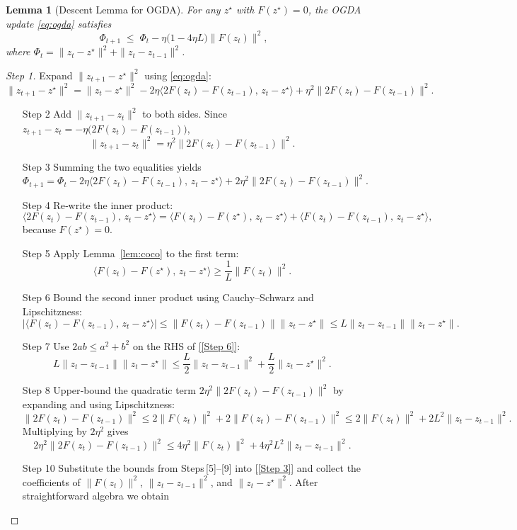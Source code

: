 \documentclass[11pt]{article}
\newtheorem{lemma}{Lemma}[section]
\begin{document}
\begin{lemma}[Descent Lemma for OGDA]\label{lem:descent}
For any $z^{\star}$ with $F(z^{\star})=0$, the OGDA update \eqref{eq:ogda} satisfies
\[
\Phi_{t+1}\;\le\;\Phi_t-\eta\bigl(1-4\eta L\bigr)\|F(z_t)\|^2,
\tag{L.2}
\]
where $\Phi_t=\|z_t-z^{\star}\|^2+\|z_t-z_{t-1}\|^2$.
\end{lemma}
\begin{proof}[Step 1] Expand $\|z_{t+1}-z^{\star}\|^2$ using \eqref{eq:ogda}:
\[
\|z_{t+1}-z^{\star}\|^2
= \|z_t-z^{\star}\|^2-2\eta\langle 2F(z_t)-F(z_{t-1}),\,z_t-z^{\star}\rangle
+\eta^2\|2F(z_t)-F(z_{t-1})\|^2.
\tag{[Step 1]}
\]
\begin{itemize}
\item[Step 2] Add $\|z_{t+1}-z_t\|^2$ to both sides. Since $z_{t+1}-z_t=-\eta\bigl(2F(z_t)-F(z_{t-1})\bigr)$,
\[
\|z_{t+1}-z_t\|^2=\eta^2\|2F(z_t)-F(z_{t-1})\|^2.
\tag{[Step 2]}
\]
\item[Step 3] Summing the two equalities yields
\[
\Phi_{t+1}= \Phi_t-2\eta\langle 2F(z_t)-F(z_{t-1}),\,z_t-z^{\star}\rangle
+2\eta^2\|2F(z_t)-F(z_{t-1})\|^2.
\tag{[Step 3]}
\]
\item[Step 4] Re‑write the inner product:
\[
\langle 2F(z_t)-F(z_{t-1}),\,z_t-z^{\star}\rangle
= \langle F(z_t)-F(z^{\star}),\,z_t-z^{\star}\rangle
+ \langle F(z_t)-F(z_{t-1}),\,z_t-z^{\star}\rangle,
\tag{[Step 4]}
\]
because $F(z^{\star})=0$.
\item[Step 5] Apply Lemma~\ref{lem:coco} to the first term:
\[
\langle F(z_t)-F(z^{\star}),\,z_t-z^{\star}\rangle\ge\frac{1}{L}\|F(z_t)\|^2.
\tag{[Step 5]}
\]
\item[Step 6] Bound the second inner product using Cauchy–Schwarz and Lipschitzness:
\[
|\langle F(z_t)-F(z_{t-1}),\,z_t-z^{\star}\rangle|
\le\|F(z_t)-F(z_{t-1})\|\|z_t-z^{\star}\|
\le L\|z_t-z_{t-1}\|\|z_t-z^{\star}\|.
\tag{[Step 6]}
\]
\item[Step 7] Use $2ab\le a^2+b^2$ on the RHS of \eqref{[Step 6]}:
\[
L\|z_t-z_{t-1}\|\|z_t-z^{\star}\|
\le\frac{L}{2}\|z_t-z_{t-1}\|^2+\frac{L}{2}\|z_t-z^{\star}\|^2.
\tag{[Step 7]}
\]
\item[Step 8] Upper‑bound the quadratic term $2\eta^2\|2F(z_t)-F(z_{t-1})\|^2$ by expanding and using Lipschitzness:
\[
\|2F(z_t)-F(z_{t-1})\|^2
\le 2\|F(z_t)\|^2+2\|F(z_t)-F(z_{t-1})\|^2
\le 2\|F(z_t)\|^2+2L^2\|z_t-z_{t-1}\|^2.
\tag{[Step 8]}
\]
Multiplying by $2\eta^2$ gives
\[
2\eta^2\|2F(z_t)-F(z_{t-1})\|^2
\le4\eta^2\|F(z_t)\|^2+4\eta^2L^2\|z_t-z_{t-1}\|^2.
\tag{[Step 9]}
\]
\item[Step 10] Substitute the bounds from Steps [5]–[9] into \eqref{[Step 3]} and collect the coefficients of $\|F(z_t)\|^2$, $\|z_t-z_{t-1}\|^2$, and $\|z_t-z^{\star}\|^2$. After straightforward algebra we obtain

\end{itemize}
\end{proof}
\end{document}
